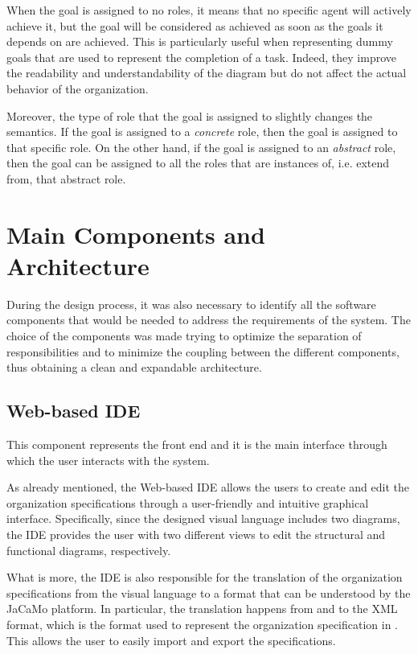 When the goal is assigned to no roles, it means that no specific agent will actively achieve it, but the goal will be considered as achieved as soon as the goals it depends on are achieved.
This is particularly useful when representing dummy goals that are used to represent the completion of a task.
Indeed, they improve the readability and understandability of the diagram but do not affect the actual behavior of the organization.

Moreover, the type of role that the goal is assigned to slightly changes the semantics.
If the goal is assigned to a \textit{concrete} role, then the goal is assigned to that specific role.
On the other hand, if the goal is assigned to an \textit{abstract} role, then the goal can be assigned to all the roles that are instances of, i.e. extend from, that abstract role.


\section{Main Components and Architecture}
During the design process, it was also necessary to identify all the software components that would be needed to address the requirements of the system.
The choice of the components was made trying to optimize the separation of responsibilities and to minimize the coupling between the different components, thus obtaining a clean and expandable architecture.

\subsection{Web-based IDE}
This component represents the front end and it is the main interface through which the user interacts with the system.

As already mentioned, the Web-based IDE allows the users to create and edit the organization specifications through a user-friendly and intuitive graphical interface.
Specifically, since the designed visual language includes two diagrams, the IDE provides the user with two different views to edit the structural and functional diagrams, respectively.

What is more, the IDE is also responsible for the translation of the organization specifications from the visual language to a format that can be understood by the JaCaMo platform.
In particular, the translation happens from and to the XML format, which is the format used to represent the organization specification in \moise{}.
This allows the user to easily import and export the specifications.

